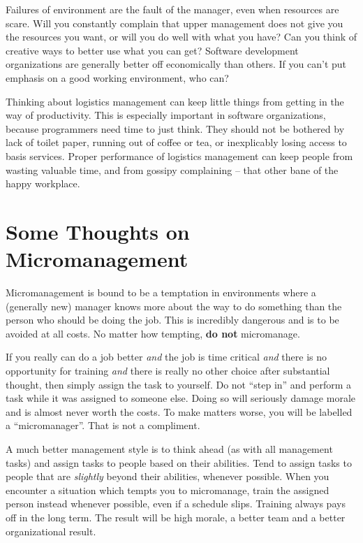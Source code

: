 Failures of environment are the fault of the manager, even when resources are scare. Will you constantly complain that upper management does not give you the resources you want, or will you do well with what you have? Can you think of creative ways to better use what you can get? Software development organizations are generally better off economically than others. If you can't put emphasis on a good working environment, who can?

Thinking about logistics management can keep little things from getting in the way of productivity. This is especially important in software organizations, because programmers need time to just think. They should not be bothered by lack of toilet paper, running out of coffee or tea, or inexplicably losing access to basis services. Proper performance of logistics management can keep people from wasting valuable time, and from gossipy complaining -- that other bane of the happy workplace.


\section{Some Thoughts on Micromanagement}

Micromanagement is bound to be a temptation in environments where a (generally new) manager knows more about the way to do something than the person who should be doing the job. This is incredibly dangerous and is to be avoided at all costs.  No matter how tempting, \textbf{do not} micromanage.

If you really can do a job better \textit{and} the job is time critical \textit{and} there is no opportunity for training \textit{and} there is really no other choice after substantial thought, then simply assign the task to yourself.  Do not ``step in'' and perform a task while it was assigned to someone else. Doing so will seriously damage morale and is almost never worth the costs.  To make matters worse, you will be labelled a ``micromanager''. That is not a compliment.

A much better management style is to think ahead (as with all management tasks) and assign tasks to people based on their abilities.  Tend to assign tasks to people that are \textit{slightly} beyond their abilities, whenever possible.  When you encounter a situation which tempts you to micromanage, train the assigned person instead whenever possible, even if a schedule slips. Training always pays off in the long term.  The result will be high morale, a better team and a better organizational result.

